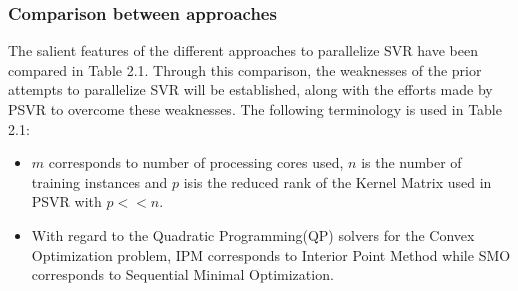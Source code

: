 \documentclass[12pt]{article}
\begin{document}
\subsubsection{Comparison between approaches}
The salient features of the different approaches to parallelize SVR  have been compared in Table 2.1. Through this comparison, the weaknesses of the prior attempts to parallelize SVR will be established, along with the efforts made by PSVR to overcome these weaknesses. \newline\newline
The following terminology is used in Table 2.1: 
\begin{itemize}
\item $m$ corresponds to number of processing cores used, $n$ is the number of training instances and $p$ isis the reduced rank of the Kernel Matrix used in PSVR with $p << n$.
\item  With regard to the Quadratic Programming(QP) solvers for the Convex Optimization problem, IPM corresponds to Interior Point Method while SMO corresponds to Sequential Minimal Optimization.
\end{itemize}
\end{document}
